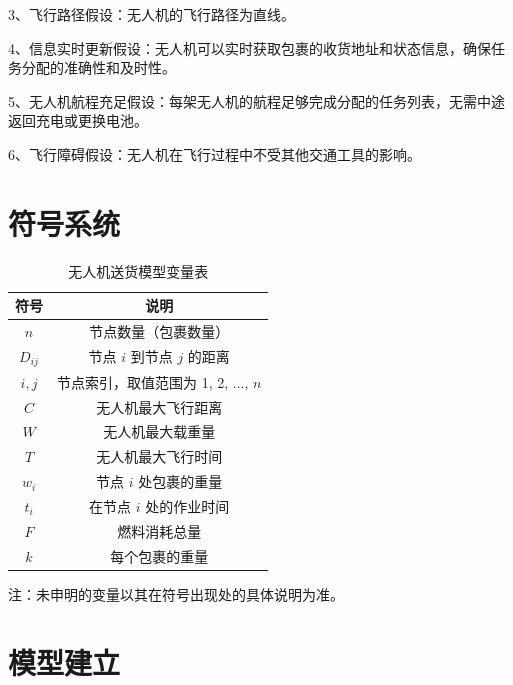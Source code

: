 \documentclass[a4paper]{article} %
\begin{document}
{    3、飞行路径假设：无人机的飞行路径为直线。

    4、信息实时更新假设：无人机可以实时获取包裹的收货地址和状态信息，确保任务分配的准确性和及时性。

    5、无人机航程充足假设：每架无人机的航程足够完成分配的任务列表，无需中途返回充电或更换电池。

    6、飞行障碍假设：无人机在飞行过程中不受其他交通工具的影响。



    \section{符号系统}
   

\begin{table}[htbp]
    \renewcommand{\thetable}{}
    \renewcommand{\tablename}{表1} %
    \centering
    \caption{无人机送货模型变量表} %
    \label{tab:tsp_variables}
    \begin{threeparttable}
        \renewcommand{\arraystretch}{1.5} %
        \begin{tabular}{@{}cc@{}} %
            \toprule
            \textbf{符号} & \textbf{说明}  \\ \hline
            \( n \) & 节点数量（包裹数量） \\
            \( D_{ij} \) & 节点 \( i \) 到节点 \( j \) 的距离 \\ 
            \( i, j \) & 节点索引，取值范围为 1, 2, ..., \( n \) \\
            \( C \) & 无人机最大飞行距离 \\ 
            \( W \) & 无人机最大载重量 \\ 
            \( T \) & 无人机最大飞行时间 \\ 
            \( w_i \) & 节点 \( i \) 处包裹的重量 \\ 
            \( t_i \) & 在节点 \( i \) 处的作业时间 \\ 
            \( F \) & 燃料消耗总量 \\ 
            \( k \) & 每个包裹的重量 \\
            \bottomrule
        \end{tabular}
    \end{threeparttable}
\end{table}
注：未申明的变量以其在符号出现处的具体说明为准。
    \section{模型建立}

}
\end{document}
